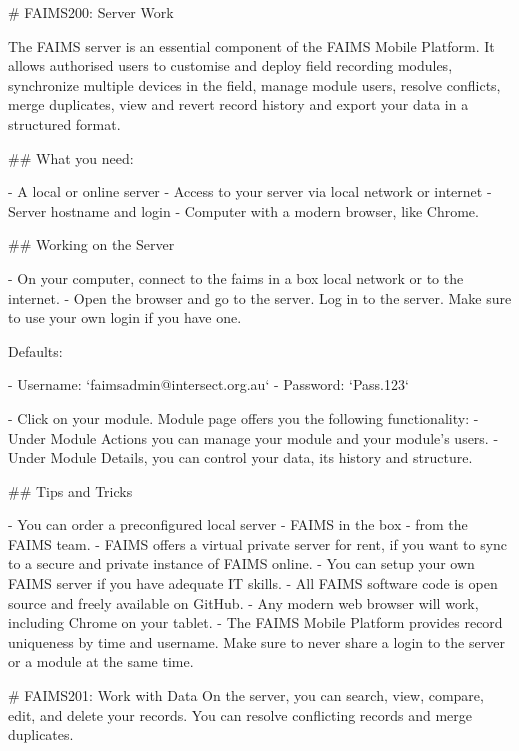 # FAIMS200: Server Work


The FAIMS server is an essential component of the FAIMS Mobile Platform. It allows authorised users to customise and deploy field recording modules, synchronize multiple devices in the field, manage module users, resolve conflicts, merge duplicates, view and revert record history and export your data in a structured format.
 
## What you need:

-  A local or online server
-  Access to your server via local network or internet
-  Server hostname and login
-  Computer with a modern browser, like Chrome.


## Working on the Server

-  On your computer, connect to the faims in a box local network or to the internet.
-  Open the browser and go to the server. Log in to the server. Make sure to use your own login if you have one. 

  Defaults: 

-   Username: `faimsadmin@intersect.org.au`
-   Password: `Pass.123`

-  Click on your module. Module page offers you the following functionality:
	-  Under Module Actions you can manage your module and your module's users.
	-  Under Module Details, you can control your data, its history and structure.





## Tips and Tricks

-  You can order a preconfigured local server - FAIMS in the box - from the FAIMS team.
-  FAIMS offers a virtual private server for rent, if you want to sync to a secure and private instance of FAIMS online.
-  You can setup your own FAIMS server if you have adequate IT skills.
-  All FAIMS software code is open source and freely available on GitHub.
-  Any modern web browser will work, including Chrome on your tablet.
-  The FAIMS Mobile Platform provides record uniqueness by time and username. Make sure to never share a login to the server or a module at the same time.




# FAIMS201: Work with Data
On the server, you can search, view, compare, edit, and delete your records. You can resolve conflicting records and merge duplicates.


